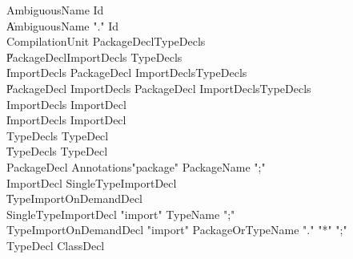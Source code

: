 {\begin{grammar}
 AmbiguousName  \: Id\\
    \| AmbiguousName \xcd"." Id\\
 CompilationUnit  \: PackageDecl\opt TypeDecls\opt\\
    \| PackageDecl\opt ImportDecls TypeDecls\opt\\
    \| ImportDecls PackageDecl  ImportDecls\opt  TypeDecls\opt\\
    \| PackageDecl ImportDecls PackageDecl  ImportDecls\opt  TypeDecls\opt\\
 ImportDecls  \: ImportDecl\\
    \| ImportDecls ImportDecl\\
 TypeDecls  \: TypeDecl\\
    \| TypeDecls TypeDecl\\
 PackageDecl  \: Annotations\opt \xcd"package" PackageName \xcd";"\\
 ImportDecl  \: SingleTypeImportDecl\\
    \| TypeImportOnDemandDecl\\
 SingleTypeImportDecl  \: \xcd"import" TypeName \xcd";"\\
 TypeImportOnDemandDecl  \: \xcd"import" PackageOrTypeName \xcd"." \xcd"*" \xcd";"\\
 TypeDecl  \: ClassDecl\\
\end{grammar}

\begin{grammar}


\end{grammar}}
